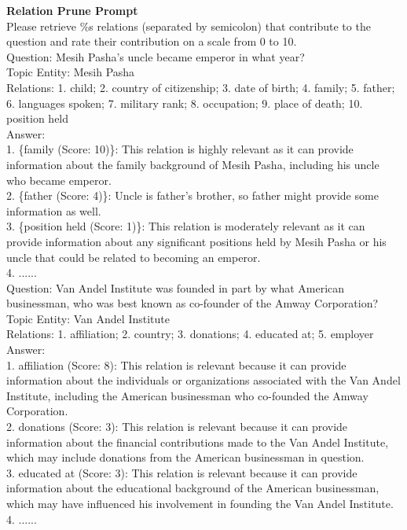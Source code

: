 \documentclass[11pt,UTF8,fontset=fandol]{ctexart}
\begin{document}
\begin{table}[H]\centering
\caption{Topic Prune Prompt（关系剪枝提示词）。}
\label{tab:15}
\end{table}
\vspace{-1.2em}
\begin{promptbox}
\small
\textbf{Relation Prune Prompt}\\
Please retrieve \%s relations (separated by semicolon) that contribute to the question and rate their contribution on a scale from 0 to 10.\\
Question: Mesih Pasha's uncle became emperor in what year?\\
Topic Entity: Mesih Pasha\\
Relations: 1. child; 2. country of citizenship; 3. date of birth; 4. family; 5. father; 6. languages spoken; 7. military rank; 8. occupation; 9. place of death; 10. position held\\[0.3em]
Answer:\\
1. \{family (Score: 10)\}: This relation is highly relevant as it can provide information about the family background of Mesih Pasha, including his uncle who became emperor.\\
2. \{father (Score: 4)\}: Uncle is father's brother, so father might provide some information as well.\\
3. \{position held (Score: 1)\}: This relation is moderately relevant as it can provide information about any significant positions held by Mesih Pasha or his uncle that could be related to becoming an emperor.\\
4. ......\\[0.3em]
Question: Van Andel Institute was founded in part by what American businessman, who was best known as co-founder of the Amway Corporation?\\
Topic Entity: Van Andel Institute\\
Relations: 1. affiliation; 2. country; 3. donations; 4. educated at; 5. employer\\[0.3em]
Answer:\\
1. affiliation (Score: 8): This relation is relevant because it can provide information about the individuals or organizations associated with the Van Andel Institute, including the American businessman who co-founded the Amway Corporation.\\
2. donations (Score: 3): This relation is relevant because it can provide information about the financial contributions made to the Van Andel Institute, which may include donations from the American businessman in question.\\
3. educated at (Score: 3): This relation is relevant because it can provide information about the educational background of the American businessman, which may have influenced his involvement in founding the Van Andel Institute.\\
4. ......
\end{promptbox}
\end{document}
